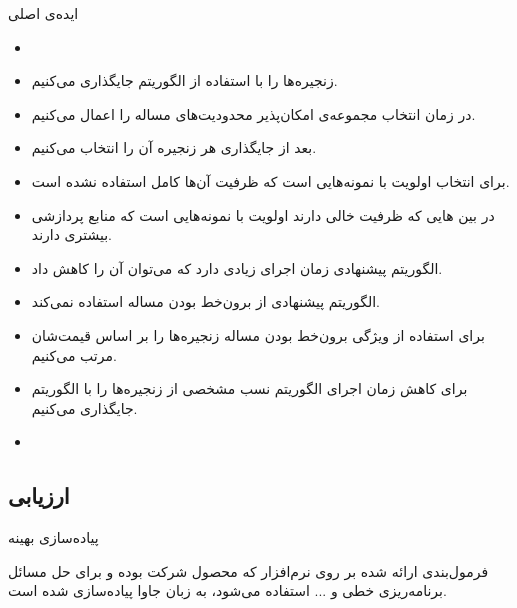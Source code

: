 \documentclass{beamer}
\makeatletter
\newcommand{\RTList}{\raggedleft\rightskip\@totalleftmargin}
\makeatother
\begin{document}
\begin{persian}
\begin{frame}{ایده‌ی اصلی}
\begin{itemize}
    \end{itemize}
\end{frame}
\begin{frame}{}
    \begin{itemize}\RTList{}
        \item {}
        \item زنجیره‌ها را با استفاده از الگوریتم  جایگذاری می‌کنیم.
        \item در زمان انتخاب مجموعه‌ی امکان‌پذیر محدودیت‌های مساله را اعمال می‌کنیم.
        \item بعد از جایگذاری هر زنجیره  آن را انتخاب می‌کنیم.
        \item برای انتخاب  اولویت با نمونه‌هایی است که ظرفیت آن‌ها کامل استفاده نشده است.
        \item در بین هایی که ظرفیت خالی دارند اولویت با نمونه‌هایی است که منابع پردازشی بیشتری دارند.
    \end{itemize}
\end{frame}
\begin{frame}{}
    \begin{itemize}\RTList{}
        \item الگوریتم پیشنهادی  زمان اجرای زیادی دارد که می‌توان آن را کاهش داد.
        \item الگوریتم پیشنهادی  از برون‌خط بودن مساله استفاده نمی‌کند.
        \item برای استفاده از ویژگی برون‌خط بودن مساله زنجیره‌ها را بر اساس قیمت‌شان مرتب می‌کنیم.
        \item برای کاهش زمان اجرای الگوریتم نسب مشخصی از زنجیره‌ها را با الگوریتم  جایگذاری می‌کنیم.
        \item {}
    \end{itemize}
\end{frame}
\begin{frame}{}
    \section{ارزیابی}
\end{frame}
\begin{frame}{پیاده‌سازی بهینه}
    \par
    فرمول‌بندی ارائه شده بر روی نرم‌افزار
    که محصول شرکت  بوده و برای حل مسائل برنامه‌ریزی خطی و ...
    استفاده می‌شود،
    به زبان جاوا پیاده‌سازی شده است.


\end{frame}
\end{persian}
\end{document}
